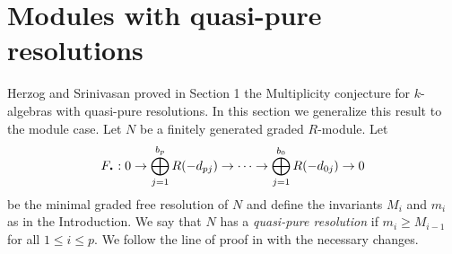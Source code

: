 \documentclass[12pt,twoside]{amsart}
\numberwithin{equation}{section}
\DeclareMathOperator{\pnt}{\raise 0.5mm \hbox{\large\bf.}}
\theoremstyle{definition}
\begin{document}
\section{Modules with quasi-pure resolutions} \label{sec-quasi-pure}
Herzog and Srinivasan  proved in \cite{HS} Section 1 the Multiplicity conjecture for
$k$-algebras with quasi-pure resolutions. In this section we generalize this result to
the module case.  Let $N$ be a finitely generated graded $R$-module. Let
$$
F_{\pnt}: 0 \to \bigoplus_{j=1}^{b_p} R(-d_{pj}) \to \dots \to \bigoplus_{j=1}^{b_0}
R(-d_{0j}) \to 0
$$
be the minimal graded free resolution of $N$ and define the invariants $M_i$ and $m_i$ as
in the Introduction. We say that $N$ has a {\em quasi-pure resolution} if $m_i\geq
M_{i-1}$ for all $1\leq i \leq p$. We follow the line of proof in \cite{HS} with the
necessary changes.
\end{document}
